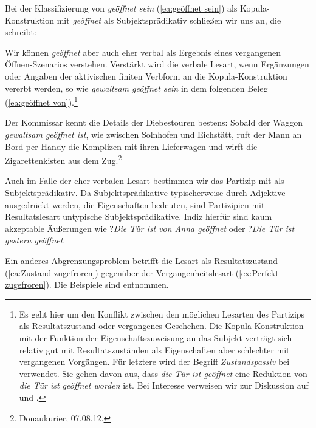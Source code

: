 Bei der Klassifizierung von \textit{geöffnet sein} (\ref{ea:geöffnet sein}) als Kopula-Konstruktion mit \textit{geöffnet} als Subjektsprädikativ schließen wir uns \citet[106]{Maienborn2007} an, die schreibt:   

Wir können \textit{geöffnet} aber auch eher verbal als Ergebnis eines vergangenen Öffnen-Szenarios verstehen. Verstärkt wird die verbale Lesart, wenn Ergänzungen oder Angaben der aktivischen finiten Verbform an die Kopula-Konstruktion vererbt werden, so wie \textit{gewaltsam geöffnet sein} in dem folgenden Beleg (\ref{ea:geöffnet von}).\footnote{Es geht hier um den Konflikt zwischen den möglichen Lesarten des Partizips als Resultatszustand oder vergangenes Geschehen. Die Kopula-Konstruktion mit der Funktion der Eigenschaftszuweisung an das Subjekt verträgt sich relativ gut mit Resultatszuständen als Eigenschaften aber schlechter mit vergangenen Vorgängen. Für letztere wird der Begriff \textit{Zustandspassiv} \ua bei \citet[155]{HelbigBuscha} verwendet. Sie gehen davon aus, dass \textit{die Tür ist geöffnet} eine Reduktion von \textit{die Tür ist geöffnet worden} ist. Bei Interesse verweisen wir zur Diskussion auf \citet{Maienborn2007} und \citet{Welke2007Zustand}.} 

\ea \label{ea:geöffnet von} Der Kommissar kennt die Details der Diebestouren bestens: Sobald der Waggon \textit{gewaltsam geöffnet ist}, wie zwischen Solnhofen und Eichstätt, ruft der Mann an Bord per Handy die Komplizen mit ihren Lieferwagen und wirft die Zigarettenkisten aus dem Zug.\footnote{Donaukurier, 07.08.12.}
\z 

Auch im Falle der eher verbalen Lesart bestimmen wir das Partizip mit \citet[106]{Maienborn2007} als Subjektsprädikativ. Da Subjektsprädikative typischerweise durch Adjektive ausgedrückt werden, die Eigenschaften bedeuten, sind Partizipien mit Resultatslesart untypische Subjektsprädikative. Indiz hierfür sind kaum akzeptable Äußerungen wie ?\textit{Die Tür ist von Anna geöffnet} oder ?\textit{Die Tür ist gestern geöffnet}.  

Ein anderes Abgrenzungsproblem betrifft die Lesart als Resultatszustand (\ref{ea:Zustand zugefroren}) gegenüber der Vergangenheitslesart (\ref{ex:Perfekt zugefroren}). Die Beispiele sind \citet[116]{Welke2007Zustand} entnommen.

